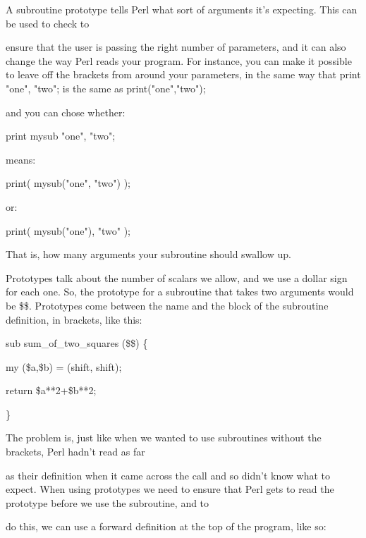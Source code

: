 \documentclass[a4paper,11pt]{book}
\begin{document}
\noindent 

\noindent A subroutine prototype tells Perl what sort of arguments it's expecting. This can be used to check to

\noindent ensure that the user is passing the right number of parameters, and it can also change the way Perl reads your program. For instance, you can make it possible to leave off the brackets from around your parameters, in the same way that print "one", "two"; is the same as print("one","two");

\noindent and you can chose whether:

\noindent 

\noindent print mysub "one", "two";

\noindent 

\noindent means:

\noindent 

\noindent print( mysub("one", "two") );

\noindent 

\noindent or:

\noindent 

\noindent print( mysub("one"), "two" );

\noindent 

\noindent That is, how many arguments your subroutine should swallow up.

\noindent 

\noindent Prototypes talk about the number of scalars we allow, and we use a dollar sign for each one. So, the prototype for a subroutine that takes two arguments would be \$\$. Prototypes come between the name and the block of the subroutine definition, in brackets, like this:

\noindent 

\noindent sub sum\_of\_two\_squares (\$\$) \{

\noindent my (\$a,\$b) = (shift, shift);

\noindent return \$a**2+\$b**2;

\noindent \}

\noindent 

\noindent The problem is, just like when we wanted to use subroutines without the brackets, Perl hadn't read as far

\noindent as their definition when it came across the call and so didn't know what to expect. When using prototypes we need to ensure that Perl gets to read the prototype before we use the subroutine, and to

\noindent do this, we can use a forward definition at the top of the program, like so:
\end{document}
